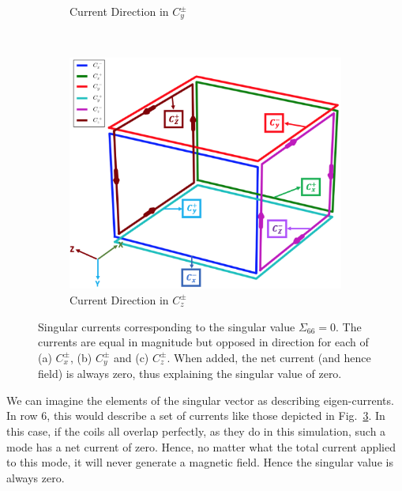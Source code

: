 \begin{figure}
\begin{subfigure}{.5\linewidth}
        \caption{Current Direction in $C_y^{\pm}$}
        \label{fig:c3}
    \end{subfigure}\\[1ex]
    \begin{subfigure}{\linewidth}
        \centering
        \includegraphics[scale=.33]{Images/c5_3}
        \caption{Current Direction in $C_z^{\pm}$}
        \label{fig:c5}
    \end{subfigure}

\caption[Singular currents corresponding to the singular value $\Sigma_{66}=0$]{Singular currents corresponding to the singular value $\Sigma_{66}=0$.  The currents are equal in magnitude but opposed in direction for each of (a) $C_x^{\pm}$, (b) $C_y^{\pm}$ and (c) $C_z^{\pm}$. When added, the net current (and hence field) is always zero, thus explaining the singular value of zero.}
    \label{fig:cDir}
\end{figure}

We can imagine the elements of the singular vector as describing
eigen-currents.  In row 6, this would describe a set of currents like
those depicted in Fig.~\ref{fig:cDir}.  In this case, if the coils all
overlap perfectly, as they do in this simulation, such a mode has a
net current of zero.  Hence, no matter what the total current applied
to this mode, it will never generate a magnetic field.  Hence the
singular value is always zero.


